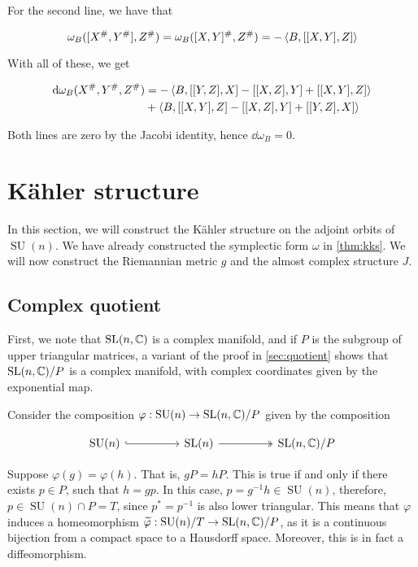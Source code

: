 \documentclass{report}
\DeclareMathOperator{\SU}{SU}
\renewcommand{\tilde}{\widetilde}
\begin{document}
For the second line, we have that

\[\omega_B([X^\#, Y^\#], Z^\#) = \omega_B([X, Y]^\#, Z^\#) = -\left\langle B, [[X, Y], Z] \right\rangle\]

With all of these, we get

\begin{align*}
    \dd\omega_B(X^\#, Y^\#, Z^\#) &= -\left\langle B, [[Y, Z], X] - [[X, Z], Y] + [[X, Y], Z] \right\rangle \\
    &+\left\langle B, [[X, Y], Z] - [[X, Z], Y] + [[Y, Z], X] \right\rangle
\end{align*}

Both lines are zero by the Jacobi identity, hence \(\dd\omega_B = 0\).

\section{K\"ahler structure}

\label{sec:kahler}

In this section, we will construct the K\"ahler structure on the adjoint orbits of \(\SU(n)\). We have already constructed the symplectic form \(\omega\) in \cref{thm:kks}. We will now construct the Riemannian metric \(g\) and the almost complex structure \(J\).

\subsection{Complex quotient}

First, we note that \(\operatorname{SL}(n, \mathbb{C})\) is a complex manifold, and if \(P\) is the subgroup of upper triangular matrices, a variant of the proof in \cref{sec:quotient} shows that \(\operatorname{SL}(n, \mathbb{C})/P\) is a complex manifold, with complex coordinates given by the exponential map.

Consider the composition \(\varphi : \SU(n) \to \SL(n, \C)/P\) given by the composition 

\[\begin{tikzcd}
	{\SU(n)} && {\SL(n)} && {\SL(n, \C)/P}
	\arrow[hook, from=1-1, to=1-3]
	\arrow[two heads, from=1-3, to=1-5]
\end{tikzcd}\]

Suppose \(\varphi(g) = \varphi(h)\). That is, \(gP = hP\). This is true if and only if there exists \(p \in P\), such that \(h = gp\). In this case, \(p = g^{-1}h \in \SU(n)\), therefore, \(p \in \SU(n) \cap P = T\), since \(p^* = p^{-1}\) is also lower triangular. This means that \(\varphi\) induces a homeomorphism \(\tilde\varphi : \SU(n)/T \to \SL(n, \C)/P\), as it is a continuous bijection from a compact space to a Hausdorff space. Moreover, this is in fact a diffeomorphism.
\end{document}
